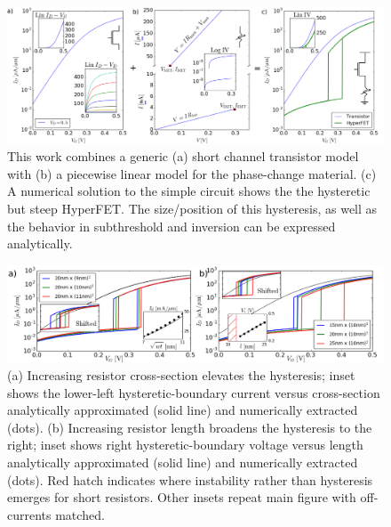 \begin{figure}[!ht]
  \centering
  \includegraphics[width=\textwidth]{images/HyperFETConstruction}
  \caption{This work combines a generic (a) short channel transistor model with (b) a piecewise linear model for the phase-change material. (c) A numerical solution to the simple circuit shows the the hysteretic but steep HyperFET.  The size/position of this hysteresis, as well as the behavior in subthreshold and inversion can be expressed analytically.}
  \label{fig:HyperFETConstruction}
\end{figure}
\begin{figure}[!ht]
  \centering
  \vspace{-2em}
  \includegraphics[width=\textwidth]{images/HFvsGeo}
  \caption{(a) Increasing resistor cross-section elevates the hysteresis; inset shows the lower-left hysteretic-boundary current versus cross-section analytically approximated (solid line) and numerically extracted (dots). (b) Increasing resistor length broadens the hysteresis to the right; inset shows right hysteretic-boundary voltage versus length analytically approximated (solid line) and numerically extracted (dots).  Red hatch indicates where instability rather than hysteresis emerges for short resistors.  Other insets repeat main figure with off-currents matched.}
  \label{fig:HFvsGeo}
\end{figure}

